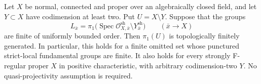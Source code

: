 \begin{proposition}
\label{D:finite-local-groups}
Let $X$ be normal, connected and proper over an algebraically closed
field, and let $Y\subset X$ have codimension at least two. Put
$U=X\setminus Y$. Suppose that the groups
\[
 L_{\bar x}=\pi_1\bigl(\operatorname{Spec}\mathcal O^{\mathrm{sh}}_{X,\bar x}
                 \setminus Y^{\mathrm{sh}}_{\bar x}\bigr)
 \qquad (\bar x\longrightarrow X)
\]
are finite of uniformly bounded order. Then $\pi_1(U)$ is
topologically finitely generated. In particular, this holds for a
finite omitted set whose punctured strict-local fundamental groups
are finite. It also holds for every strongly F-regular proper $X$
in positive characteristic, with arbitrary codimension-two $Y$.
No quasi-projectivity assumption is required.
\end{proposition}

